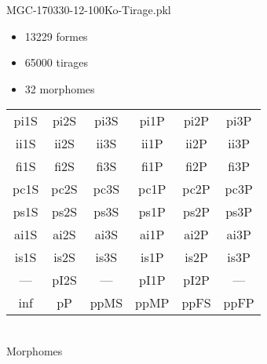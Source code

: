 MGC-170330-12-100Ko-Tirage.pkl
\begin{itemize}
\item 13229 formes
\item 65000 tirages
\item 32 morphomes
\end{itemize}
\begin{center}
\begin{tabular}{cccccc}
\hline
\cellcolor{white}pi1S & \cellcolor{orange}pi2S & \cellcolor{orange}pi3S & \cellcolor{white}pi1P & \cellcolor{white}pi2P & \cellcolor{white}pi3P\\
\cellcolor{brown}ii1S & \cellcolor{brown}ii2S & \cellcolor{brown}ii3S & \cellcolor{white}ii1P & \cellcolor{white}ii2P & \cellcolor{brown}ii3P\\
\cellcolor{yellow}fi1S & \cellcolor{lime}fi2S & \cellcolor{lime}fi3S & \cellcolor{green}fi1P & \cellcolor{white}fi2P & \cellcolor{green}fi3P\\
\cellcolor{yellow}pc1S & \cellcolor{yellow}pc2S & \cellcolor{yellow}pc3S & \cellcolor{white}pc1P & \cellcolor{white}pc2P & \cellcolor{yellow}pc3P\\
\cellcolor{teal}ps1S & \cellcolor{white}ps2S & \cellcolor{teal}ps3S & \cellcolor{white}ps1P & \cellcolor{white}ps2P & \cellcolor{teal}ps3P\\
\cellcolor{white}ai1S & \cellcolor{lightgray}ai2S & \cellcolor{lightgray}ai3S & \cellcolor{white}ai1P & \cellcolor{pink}ai2P & \cellcolor{white}ai3P\\
\cellcolor{pink}is1S & \cellcolor{pink}is2S & \cellcolor{lightgray}is3S & \cellcolor{pink}is1P & \cellcolor{black}is2P & \cellcolor{pink}is3P\\
--- & \cellcolor{white}pI2S & --- & \cellcolor{white}pI1P & \cellcolor{white}pI2P & ---\\
\cellcolor{white}inf & \cellcolor{white}pP & \cellcolor{white}ppMS & \cellcolor{white}ppMP & \cellcolor{white}ppFS & \cellcolor{white}ppFP\\
\hline
\end{tabular}\\
Morphomes
\end{center}
\bigskip

